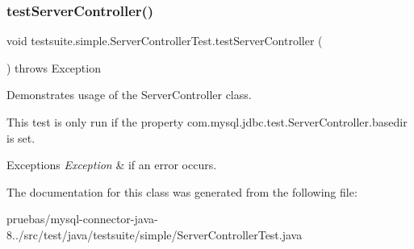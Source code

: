 \subsubsection{\texorpdfstring{test\+Server\+Controller()}{testServerController()}}
{\footnotesize\ttfamily void testsuite.\+simple.\+Server\+Controller\+Test.\+test\+Server\+Controller (\begin{DoxyParamCaption}{ }\end{DoxyParamCaption}) throws Exception}

Demonstrates usage of the Server\+Controller class.

This test is only run if the property \textquotesingle{}com.\+mysql.\+jdbc.\+test.\+Server\+Controller.\+basedir\textquotesingle{} is set.


\begin{DoxyExceptions}{Exceptions}
{\em Exception} & if an error occurs. \\
\hline
\end{DoxyExceptions}


The documentation for this class was generated from the following file\+:\begin{DoxyCompactItemize}
\item 
pruebas/mysql-\/connector-\/java-\/8../src/test/java/testsuite/simple/Server\+Controller\+Test.\+java\end{DoxyCompactItemize}
